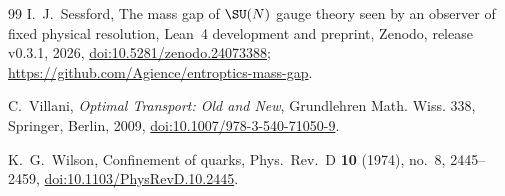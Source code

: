 \begin{thebibliography}{99}
I.~J.~Sessford, The mass gap of $\SU(N)$ gauge theory seen by an observer of
fixed physical resolution, Lean~4 development and preprint, Zenodo, release
v0.3.1, 2026,
\href{https://doi.org/10.5281/zenodo.24073388}{doi:10.5281/zenodo.24073388};
\url{https://github.com/Agience/entroptics-mass-gap}.

C.~Villani, \emph{Optimal Transport: Old and New}, Grundlehren Math. Wiss.
338, Springer, Berlin, 2009,
\href{https://doi.org/10.1007/978-3-540-71050-9}{doi:10.1007/978-3-540-71050-9}.

K.~G.~Wilson, Confinement of quarks, Phys.\ Rev.\ D \textbf{10} (1974), no.~8, 2445--2459,
\href{https://doi.org/10.1103/PhysRevD.10.2445}{doi:10.1103/\allowbreak PhysRevD.10.2445}.

\end{thebibliography}


